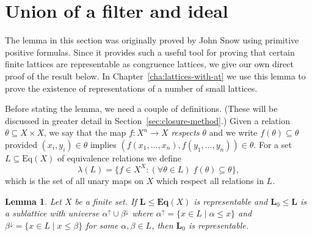 \documentclass[cm,dissertation]{uhthesis}
\theoremstyle{plain}
\newtheorem{lemma}[theorem]{Lemma}
\theoremstyle{definition}
\theoremstyle{remark}
\numberwithin{theorem}{section}
\numberwithin{claim}{chapter}
\numberwithin{equation}{section}
\numberwithin{conjecture}{chapter}
\newcommand{\<}{\ensuremath{\langle}}
\renewcommand{\>}{\ensuremath{\rangle}}
\renewcommand{\leq}{\ensuremath{\leqslant}}
\newcommand{\Eq}{\ensuremath{\mathrm{Eq}}}
\newcommand{\bEqX}{\ensuremath{\mathbf{Eq}(X)}}
\newcommand{\0}{\ensuremath{\mathbf{0}}}
\newcommand{\1}{\ensuremath{\mathbf{1}}}
\newcommand{\2}{\ensuremath{\mathbf{2}}}
\newcommand{\3}{\ensuremath{\mathbf{3}}}
\newcommand{\4}{\ensuremath{\mathbf{4}}}
\newcommand{\5}{\ensuremath{\mathbf{5}}}
\newcommand{\bL}{\ensuremath{\mathbf{L}}}
\newcommand{\bn}{\ensuremath{\mathbf{n}}}
\newcommand{\upalpha}{\ensuremath{\alpha^{\uparrow}}}
\newcommand{\downbeta}{\ensuremath{\beta^{\downarrow}}}
\begin{document}
\renewcommand{\bn}{\ensuremath{\mathbf{n}}}
\renewcommand{\5}{\ensuremath{\mathbf{5}}}

\section{Union of a filter and ideal}
\label{sec:union-filter-ideal}
The lemma in this section was originally proved by John Snow using primitive positive
formulas.  Since it provides such a useful tool for proving that certain finite lattices 
are representable as congruence lattices, we give our own direct
proof of the result below.  In Chapter~\ref{cha:lattices-with-at} we use this lemma to prove
the existence of representations of a number of small lattices.

Before stating the lemma, we need a couple of definitions.  (These will be
discussed in greater detail in Section~\ref{sec:closure-method}.)
Given a relation $\theta \subseteq X\times X$, we say that the map 
$f: X^n\rightarrow X$ \emph{respects} $\theta$ and we write 
$f(\theta) \subseteq \theta$ provided $(x_i, y_i)\in \theta$ implies
$(f(x_1, \dots, x_n), f(y_1, \dots, y_n))\in \theta$.
For a set $L\subseteq \Eq(X)$ of equivalence relations we define
      \[
      \lambda(L) = \{f\in X^X: (\forall \theta \in L) \; f(\theta) \subseteq \theta \},
      \]
which is the set of all unary maps on $X$ which respect all relations in $L$.
\begin{lemma} 
\label{lemma:union-filter-ideal}
Let $X$ be a finite set.
  If $\bL \leq \bEqX$ is representable and $\bL_0\leq \bL$ is a sublattice with universe
  $\upalpha\cup \downbeta$ where $\upalpha=\{x\in L \mid \alpha \leq x\}$ and 
$\downbeta=\{x\in L \mid x\leq \beta\}$ for some $\alpha, \beta \in L$, then $\bL_0$ is representable.
\end{lemma}

\vskip3mm
\end{document}
